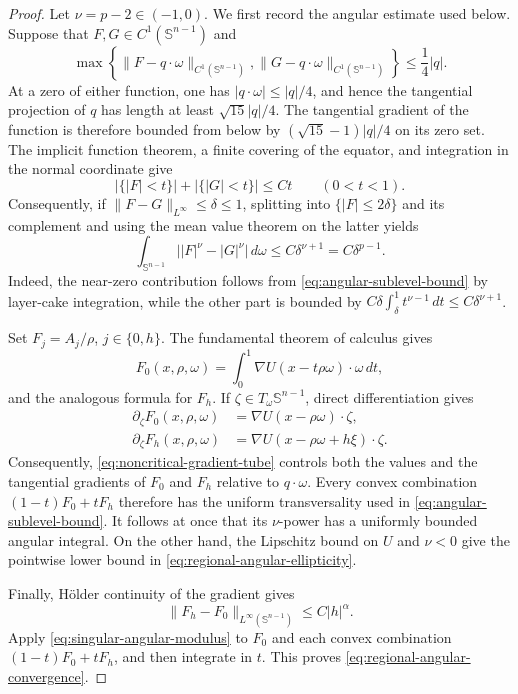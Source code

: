 \documentclass[11pt,reqno]{amsart}
\numberwithin{equation}{section}
\newcommand{\dd}{\,d}
\theoremstyle{remark}
\begin{document}
\begin{proof}
Let $\nu=p-2\in(-1,0)$.  We first record the angular estimate used
below.  Suppose that \(F,G\in C^1(\mathbb S^{n-1})\) and
\begin{equation*}
 \max\left\{
 \|F-q\cdot\omega\|_{C^1(\mathbb S^{n-1})},
 \|G-q\cdot\omega\|_{C^1(\mathbb S^{n-1})}
 \right\}\le\frac14|q|.
\end{equation*}
At a zero of either function, one has
\(|q\cdot\omega|\le|q|/4\), and hence the tangential projection of \(q\)
has length at least \(\sqrt{15}|q|/4\).  The tangential gradient of the
function is therefore bounded from below by
\((\sqrt{15}-1)|q|/4\) on its zero set.  The
implicit function theorem, a finite covering of the equator, and
integration in the normal coordinate give
\begin{equation}
 \bigl|\{|F|<t\}\bigr|+\bigl|\{|G|<t\}\bigr|\le Ct
 \qquad(0<t<1).
 \label{eq:angular-sublevel-bound}
\end{equation}
Consequently, if $\|F-G\|_{L^\infty}\le\delta\le1$, splitting into
$\{|F|\le2\delta\}$ and its complement and using the mean value theorem on
the latter yields
\begin{equation}
 \int_{\mathbb S^{n-1}}
 \bigl||F|^\nu-|G|^\nu\bigr|\dd\omega
 \le C\delta^{\nu+1}=C\delta^{p-1}.
 \label{eq:singular-angular-modulus}
\end{equation}
Indeed, the near-zero contribution follows from
\eqref{eq:angular-sublevel-bound} by layer-cake integration, while the other
part is bounded by
$C\delta\int_\delta^1 t^{\nu-1}\dd t\le C\delta^{\nu+1}$.

Set $F_j=A_j/\rho$, $j\in\{0,h\}$.  The fundamental theorem of calculus
gives
\[
 F_0(x,\rho,\omega)
 =\int_0^1\nabla U(x-t\rho\omega)\cdot\omega\dd t,
\]
and the analogous formula for $F_h$.  If
\(\zeta\in T_\omega\mathbb S^{n-1}\), direct differentiation gives
\begin{align*}
 \partial_\zeta F_0(x,\rho,\omega)
 &=\nabla U(x-\rho\omega)\cdot\zeta,\\
 \partial_\zeta F_h(x,\rho,\omega)
 &=\nabla U(x-\rho\omega+h\xi)\cdot\zeta.
\end{align*}
Consequently, \eqref{eq:noncritical-gradient-tube} controls both the
values and the tangential gradients of \(F_0\) and \(F_h\) relative to
\(q\cdot\omega\).  Every convex combination
$(1-t)F_0+tF_h$ therefore has the uniform transversality used in
\eqref{eq:angular-sublevel-bound}.  It follows at once that its
$\nu$-power has a uniformly bounded angular integral.  On the other hand,
the Lipschitz bound on $U$ and $\nu<0$ give the pointwise lower bound in
\eqref{eq:regional-angular-ellipticity}.

Finally, H\"older continuity of the gradient gives
\[
 \|F_h-F_0\|_{L^\infty(\mathbb S^{n-1})}
 \le C|h|^\alpha.
\]
Apply \eqref{eq:singular-angular-modulus} to $F_0$ and each convex
combination $(1-t)F_0+tF_h$, and then integrate in $t$.  This proves
\eqref{eq:regional-angular-convergence}.
\end{proof}
\end{document}
